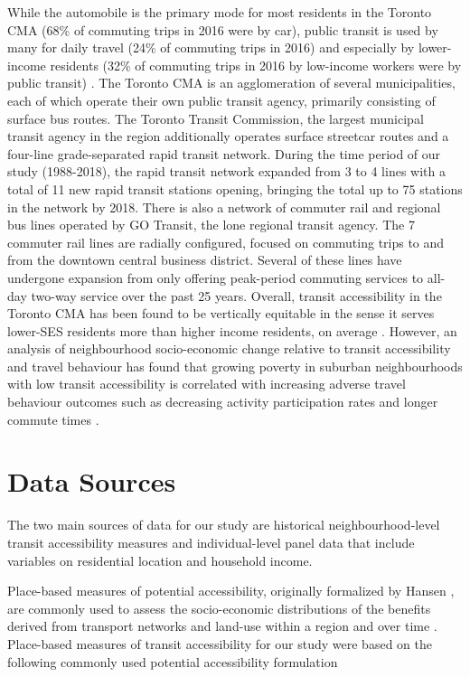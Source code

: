 While the automobile is the primary mode for most residents in the Toronto CMA (68\% of commuting trips in 2016 were by car), public transit is used by many for daily travel (24\% of commuting trips in 2016) and especially by lower-income residents (32\% of commuting trips in 2016 by low-income workers were by public transit) \cite{government_of_canada_2016_2016}. The Toronto CMA is an agglomeration of several municipalities, each of which operate their own public transit agency, primarily consisting of surface bus routes. The Toronto Transit Commission, the largest municipal transit agency in the region additionally operates surface streetcar routes and a four-line grade-separated rapid transit network. During the time period of our study (1988-2018), the rapid transit network expanded from 3 to 4 lines with a total of 11 new rapid transit stations opening, bringing the total up to 75 stations in the network by 2018. There is also a network of commuter rail and regional bus lines operated by GO Transit, the lone regional transit agency. The 7 commuter rail lines are radially configured, focused on commuting trips to and from the downtown central business district. Several of these lines have undergone expansion from only offering peak-period commuting services to all-day two-way service over the past 25 years. Overall, transit accessibility in the Toronto CMA has been found to be vertically equitable in the sense it serves lower-SES residents more than higher income residents, on average \cite{deboosere_evaluating_2018,allen_sizing_2019}. However, an analysis of neighbourhood socio-economic change relative to transit accessibility and travel behaviour has found that growing poverty in suburban neighbourhoods with low transit accessibility is correlated with increasing adverse travel behaviour outcomes such as decreasing activity participation rates and longer commute times \cite{allen_suburbanization_2021}. 





\section{Data Sources}

The two main sources of data for our study are historical neighbourhood-level transit accessibility measures and individual-level panel data that include variables on residential location and household income. 

Place-based measures of potential accessibility, originally formalized by Hansen \cite{hansen_how_1959}, are commonly used to assess the socio-economic distributions of the benefits derived from transport networks and land-use within a region and over time \cite{manaugh_who_2012,pereira_future_2019}. Place-based measures of transit accessibility for our study were based on the following commonly used potential accessibility formulation \cite{hansen_how_1959,levinson_towards_2020}

